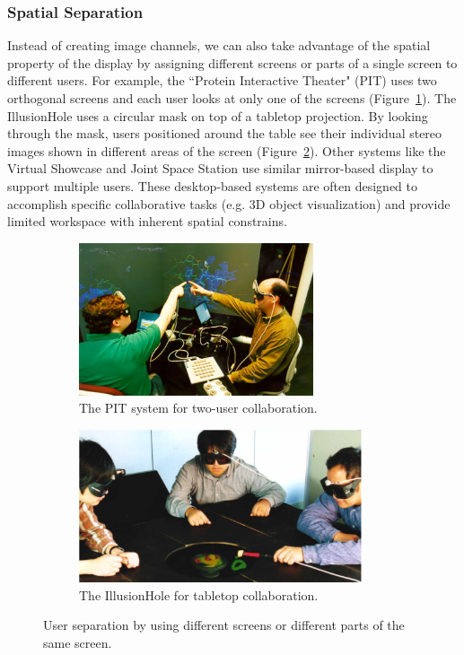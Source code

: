 \subsubsection{Spatial Separation}
Instead of creating image channels, we can also take advantage of the spatial property of the display by assigning different screens or parts of a single screen to different users. For example, the ``Protein Interactive Theater" (PIT) \citep{Arthur1998PIT} uses two orthogonal screens and each user looks at only one of the screens (Figure~\ref{fig:2_sep_spatial:pit}). The IllusionHole \citep{Kitamura2001Interactive} uses a circular mask on top of a tabletop projection. By looking through the mask, users positioned around the table see their individual stereo images shown in different areas of the screen (Figure~\ref{fig:2_sep_spatial:illu}). Other systems like the Virtual Showcase \citep{Bimber2006Virtual}and Joint Space Station \citep{Mulder2004Modular} use similar mirror-based display to support multiple users. These desktop-based systems are often designed to accomplish specific collaborative tasks (e.g. 3D object visualization) and provide limited workspace with inherent spatial constrains. 

\begin{figure}[htb]
  \begin{subfigure}{.45\textwidth}
    \centering
    \includegraphics[height=4.5cm]{figures/ch2/pit}
    \caption{The PIT system for two-user collaboration.}
    \label{fig:2_sep_spatial:pit}
  \end{subfigure}
  \begin{subfigure}{.55\textwidth}
    \centering
    \includegraphics[height=4.5cm]{figures/ch2/illusionHole}
    \caption{The IllusionHole for tabletop collaboration.}
    \label{fig:2_sep_spatial:illu}
  \end{subfigure}
  \caption{\label{fig:2_sep_spatial}User separation by using different screens or different parts of the same screen.}
\end{figure}

